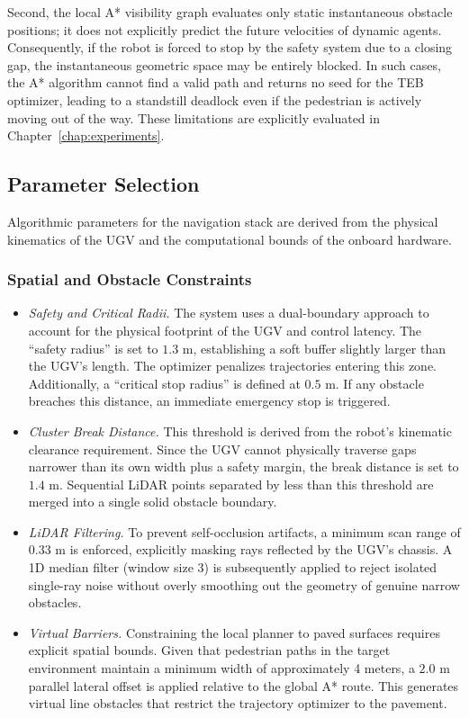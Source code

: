 Second, the local A* visibility graph evaluates only static instantaneous obstacle positions; it does not explicitly predict the future velocities of dynamic agents. Consequently, if the robot is forced to stop by the safety system due to a closing gap, the instantaneous geometric space may be entirely blocked. In such cases, the A* algorithm cannot find a valid path and returns no seed for the TEB optimizer, leading to a standstill deadlock even if the pedestrian is actively moving out of the way. These limitations are explicitly evaluated in Chapter~\ref{chap:experiments}.

\subsection{Parameter Selection}
\label{subsec:parameter-selection}

Algorithmic parameters for the navigation stack are derived from the physical kinematics of the UGV and the computational bounds of the onboard hardware.

\subsubsection{Spatial and Obstacle Constraints}
\label{subsubsec:spatial-constraints}
\begin{itemize}
    \item \textit{Safety and Critical Radii.} The system uses a dual-boundary approach to account for the physical footprint of the UGV and control latency. The ``safety radius'' is set to $1.3\text{ m}$, establishing a soft buffer slightly larger than the UGV's length. The optimizer penalizes trajectories entering this zone. Additionally, a ``critical stop radius'' is defined at $0.5\text{ m}$. If any obstacle breaches this distance, an immediate emergency stop is triggered.
    \item \textit{Cluster Break Distance.} This threshold is derived from the robot's kinematic clearance requirement. Since the UGV cannot physically traverse gaps narrower than its own width plus a safety margin, the break distance is set to $1.4\text{ m}$. Sequential LiDAR points separated by less than this threshold are merged into a single solid obstacle boundary.
    \item \textit{LiDAR Filtering.} To prevent self-occlusion artifacts, a minimum scan range of $0.33\text{ m}$ is enforced, explicitly masking rays reflected by the UGV's chassis. A 1D median filter (window size $3$) is subsequently applied to reject isolated single-ray noise without overly smoothing out the geometry of genuine narrow obstacles.
    \item \textit{Virtual Barriers.} Constraining the local planner to paved surfaces requires explicit spatial bounds. Given that pedestrian paths in the target environment maintain a minimum width of approximately 4 meters, a $2.0\text{ m}$ parallel lateral offset is applied relative to the global A* route. This generates virtual line obstacles that restrict the trajectory optimizer to the pavement.
\end{itemize}

